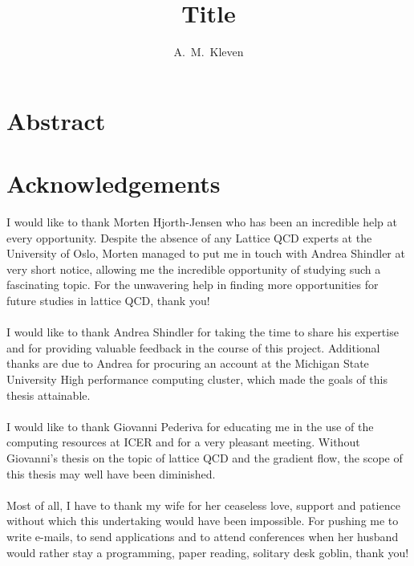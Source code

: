 \documentclass[a4paper,10pt]{book}
\title{Title}
\author{A.\ M.\ Kleven}
\begin{document}
\uiomasterfp[nosp, program={Computational science: physics},supervisors={Prof. A. Shindler\and Prof. M. Hjort-Jensen},title={Title},dept={Department of physics},color=grey]


\tableofcontents{}
\listoffigures{}
\listoftables{}
\chapter*{Abstract} 
\chapter*{Acknowledgements}
I would like to thank Morten Hjorth-Jensen who has been an incredible help at every opportunity. Despite the absence of any Lattice QCD experts at the University of Oslo, Morten managed to put me in touch with Andrea Shindler at very short notice, allowing me the incredible opportunity of studying such a fascinating topic. For the unwavering help in finding more opportunities for future studies in lattice QCD, thank you!\\\\I would like to thank Andrea Shindler for taking the time to share his expertise and for providing valuable feedback in the course of this project. Additional thanks are due to Andrea for procuring an account at the Michigan State University High performance computing cluster, which made the goals of this thesis attainable.\\\\I would like to thank Giovanni Pederiva for educating me in the use of the computing resources at ICER and for a very pleasant meeting. Without Giovanni's thesis on the topic of lattice QCD and the gradient flow, the scope of this thesis may well have been diminished.\\\\Most of all, I have to thank my wife for her ceaseless love, support and patience without which this undertaking would have been impossible. For pushing me to write e-mails, to send applications and to attend conferences when her husband would rather stay a programming, paper reading, solitary desk goblin, thank you!
\end{document}
